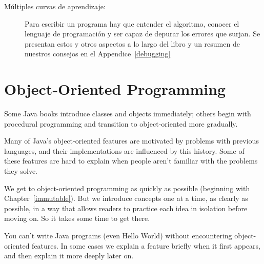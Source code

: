 \begin{description}
\item[Múltiples curvas de aprendizaje:]
Para escribir un programa hay que entender el algoritmo, conocer el lenguaje de programación y ser capaz de depurar los errores que surjan.
Se presentan estos y otros aspectos a lo largo del libro y un resumen de nuestros consejos en el Appendice~\ref{debugging}



\end{description}


\section*{Object-Oriented Programming}

Some Java books introduce classes and objects immediately; others begin with procedural programming and transition to object-oriented more gradually.

Many of Java's object-oriented features are motivated by problems with previous languages, and their implementations are influenced by this history.
Some of these features are hard to explain when people aren't familiar with the problems they solve.

We get to object-oriented programming as quickly as possible (beginning with Chapter~\ref{immutable}).
But we introduce concepts one at a time, as clearly as possible, in a way that allows readers to practice each idea in isolation before moving on.
So it takes some time to get there.

You can't write Java programs (even Hello World) without encountering object-oriented features.
In some cases we explain a feature briefly when it first appears, and then explain it more deeply later on.

